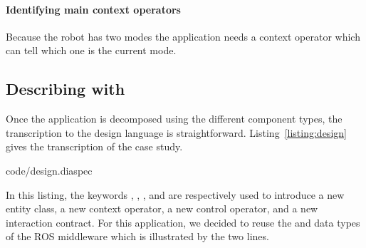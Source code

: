 \paragraph{Identifying main context operators}
Because the robot has two modes the application needs a context
operator which can tell which one is the current mode.



\subsection{Describing with \diaspec{}}

Once the application is decomposed using the different component types,
the transcription to the \diaspec{} design language is
straightforward. Listing~\ref{listing:design} gives the transcription
of the case study.

%
{code/design.diaspec}

In this listing, the keywords , ,
, and  are respectively used to introduce
a new entity class, a new context operator, a new control operator,
and a new interaction contract. For this application, we decided to
reuse the  and  data types of the ROS middleware
which is illustrated by the two  lines.



